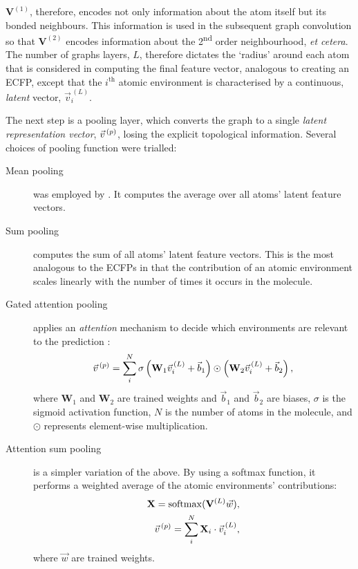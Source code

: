 $\mathbf{V}^{(1)}$, therefore, encodes not only information about the atom itself but its bonded neighbours. This information is used in the subsequent graph convolution so that $\mathbf{V}^{(2)}$ encodes information about the
2\textsuperscript{nd} order neighbourhood, \emph{et cetera}. The number of graphs layers, $L$, therefore dictates the `radius' around each atom that is considered in computing the final feature vector, analogous to creating an ECFP, except that the $i^\text{th}$ atomic environment is characterised by a continuous, \emph{latent} vector, $\vec{v}^{\,(L)}_i$.

The next step is a pooling layer, which converts the graph to a single \emph{latent representation vector}, $\vec{v}^{\,(p)}{}$, losing the explicit topological information. Several choices of pooling function were trialled:

\begin{description}
    \item[Mean pooling] was employed by \citeqin. It computes the average
          over all atoms' latent feature vectors.
    \item[Sum pooling] computes the sum of all atoms' latent feature vectors.
          This is the most analogous to the ECFPs in that the contribution of an atomic environment scales linearly with the number of times it occurs
          in the molecule.
    \item[Gated attention pooling] applies an \emph{attention} mechanism to decide which environments
          are relevant to the prediction \cite{liGatedGraphSequence2017}:
          \begin{equation}
              \vec{v}^{\,(p)}{} = \sum_i^N \sigma\left(\mathbf{W}_1 \vec{v}_i^{\,(L)} + \vec{b}_1 \right) \odot \left(\mathbf{W}_2 \vec{v}_i^{\,(L)} + \vec{b}_2 \right),
          \end{equation}
          where $\mathbf{W}_1$ and $\mathbf{W}_2$ are trained weights and
          $\vec{b}_1$ and $\vec{b}_2$ are biases, $\sigma$ is the sigmoid
          activation function, $N$ is the number of atoms in the molecule, and
          $\odot$ represents element-wise multiplication.
    \item[Attention sum pooling] is a simpler variation of the above. By using a
          softmax function, it performs a weighted average of the atomic environments'
          contributions:
          \begin{align}
              \mathbf{X} = \mathrm{softmax}(\mathbf{V}^{(L)}\vec{w}), \\
              \vec{v}^{\,(p)}{} = \sum_i^N \mathbf{X}_i \cdot \vec{v}^{\,(L)}_i,
          \end{align}
          where $\vec{w}$ are trained weights.
\end{description}

